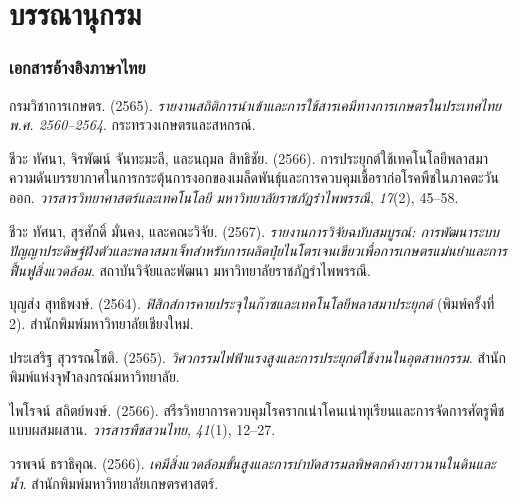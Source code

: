 
\chapter*{บรรณานุกรม}

\begingroup
\setlength{\parindent}{0pt}
\setlength{\hangindent}{2.0em}
\setlength{\parskip}{8pt}

\subsection*{เอกสารอ้างอิงภาษาไทย}

กรมวิชาการเกษตร. (2565). \textit{รายงานสถิติการนำเข้าและการใช้สารเคมีทางการเกษตรในประเทศไทย พ.ศ. 2560--2564}. กระทรวงเกษตรและสหกรณ์.

ชีวะ ทัศนา, จิรพัฒน์ จันทะมะลี, และนฤมล สิทธิชัย. (2566). การประยุกต์ใช้เทคโนโลยีพลาสมาความดันบรรยากาศในการกระตุ้นการงอกของเมล็ดพันธุ์และการควบคุมเชื้อราก่อโรคพืชในภาคตะวันออก. \textit{วารสารวิทยาศาสตร์และเทคโนโลยี มหาวิทยาลัยราชภัฏรำไพพรรณี}, \textit{17}(2), 45--58.

ชีวะ ทัศนา, สุรศักดิ์ มั่นคง, และคณะวิจัย. (2567). \textit{รายงานการวิจัยฉบับสมบูรณ์: การพัฒนาระบบปัญญาประดิษฐ์ฝังตัวและพลาสมาเจ็ทสำหรับการผลิตปุ๋ยไนโตรเจนเขียวเพื่อการเกษตรแม่นยำและการฟื้นฟูสิ่งแวดล้อม}. สถาบันวิจัยและพัฒนา มหาวิทยาลัยราชภัฏรำไพพรรณี.

บุญส่ง สุทธิพงษ์. (2564). \textit{ฟิสิกส์การคายประจุในก๊าซและเทคโนโลยีพลาสมาประยุกต์} (พิมพ์ครั้งที่ 2). สำนักพิมพ์มหาวิทยาลัยเชียงใหม่.

ประเสริฐ สุวรรณโชติ. (2565). \textit{วิศวกรรมไฟฟ้าแรงสูงและการประยุกต์ใช้งานในอุตสาหกรรม}. สำนักพิมพ์แห่งจุฬาลงกรณ์มหาวิทยาลัย.

ไพโรจน์ สถิตย์พงษ์. (2566). สรีรวิทยาการควบคุมโรครากเน่าโคนเน่าทุเรียนและการจัดการศัตรูพืชแบบผสมผสาน. \textit{วารสารพืชสวนไทย}, \textit{41}(1), 12--27.

วรพจน์ ธราธิคุณ. (2566). \textit{เคมีสิ่งแวดล้อมขั้นสูงและการบำบัดสารมลพิษตกค้างยาวนานในดินและน้ำ}. สำนักพิมพ์มหาวิทยาลัยเกษตรศาสตร์.

